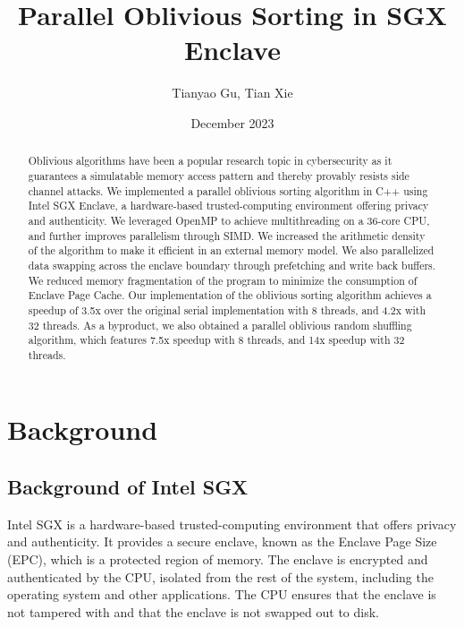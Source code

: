 \documentclass{article}
\title{Parallel Oblivious Sorting in SGX Enclave}
\author{Tianyao Gu, Tian Xie}
\date{December 2023}
\begin{document}
\maketitle

\begin{abstract}
    Oblivious algorithms have been a popular research topic in cybersecurity as it guarantees a simulatable memory access pattern and thereby provably resists side channel attacks. We implemented a parallel oblivious sorting algorithm in C++ using Intel SGX Enclave, a hardware-based trusted-computing environment offering privacy and authenticity. We leveraged OpenMP to achieve multithreading on a 36-core CPU, and further improves parallelism through SIMD. We increased the arithmetic density of the algorithm to make it efficient in an external memory model. We also parallelized data swapping across the enclave boundary through prefetching and write back buffers. We reduced memory fragmentation of the program to minimize the consumption of Enclave Page Cache. Our implementation of the oblivious sorting algorithm achieves a speedup of {\color{blue} 3.5}x over the original serial implementation with 8 threads, and {\color{blue} 4.2}x with 32 threads. As a byproduct, we also obtained a parallel oblivious random shuffling algorithm, which features {\color{blue} 7.5}x speedup with 8 threads, and {\color{blue} 14}x speedup with 32 threads.
\end{abstract}

\section{Background}
\subsection{Background of Intel SGX}
Intel SGX is a hardware-based trusted-computing environment that offers privacy and authenticity. It provides a secure enclave, known as the Enclave Page Size (EPC), which is a protected region of memory. The enclave is encrypted and authenticated by the CPU, isolated from the rest of the system, including the operating system and other applications. The CPU ensures that the enclave is not tampered with and that the enclave is not swapped out to disk. 
\end{document}
